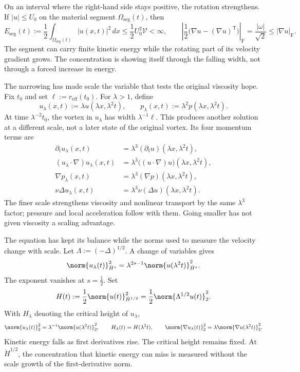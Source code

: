 On an interval where the right-hand side stays positive, the rotation strengthens.
If \(|u|\leq U_0\) on the material segment \(\Omega_{\mathrm{seg}}(t)\), then
\[
  E_{\mathrm{seg}}(t)
  :=
  \frac12\int_{\Omega_{\mathrm{seg}}(t)}|u(x,t)|^2\,dx
  \leq
  \frac12U_0^2\mathcal V
  <
  \infty,
  \qquad
  \left|\frac12\bigl(\nabla u-(\nabla u)^{\mathsf T}\bigr)\right|_{\mathrm F}
  =
  \frac{|\omega|}{\sqrt2}
  \leq
  |\nabla u|_{\mathrm F}.
\]
The segment can carry finite kinetic energy while the rotating part of its velocity gradient grows.
The concentration is showing itself through the falling width, not through a forced increase in energy.


The narrowing has made scale the variable that tests the original viscosity hope.
Fix \(t_0\) and set \(\ell:=r_{\mathrm{eff}}(t_0)\).
For \(\lambda>1\), define
\[
  u_\lambda(x,t)
  :=
  \lambda u(\lambda x,\lambda^2t),
  \qquad
  p_\lambda(x,t)
  :=
  \lambda^2p(\lambda x,\lambda^2t).
\]
At time \(\lambda^{-2}t_0\), the vortex in \(u_\lambda\) has width \(\lambda^{-1}\ell\).
This produces another solution at a different scale, not a later state of the original vortex.
Its four momentum terms are
\[
\begin{aligned}
  \partial_tu_\lambda(x,t)
  &=
  \lambda^3(\partial_tu)(\lambda x,\lambda^2t),
  \\
  (u_\lambda\cdot\nabla)u_\lambda(x,t)
  &=
  \lambda^3\bigl((u\cdot\nabla)u\bigr)(\lambda x,\lambda^2t),
  \\
  \nabla p_\lambda(x,t)
  &=
  \lambda^3(\nabla p)(\lambda x,\lambda^2t),
  \\
  \nu\Delta u_\lambda(x,t)
  &=
  \lambda^3\nu(\Delta u)(\lambda x,\lambda^2t).
\end{aligned}
\]
The finer scale strengthens viscosity and nonlinear transport by the same \(\lambda^3\) factor; pressure and local acceleration follow with them.
Going smaller has not given viscosity a scaling advantage.


The equation has kept its balance while the norms used to measure the velocity change with scale.
Let \(\Lambda:=(-\Delta)^{1/2}\).
A change of variables gives
\[
  \norm{u_\lambda(t)}_{\dot H^s}^2
  =
  \lambda^{2s-1}
  \norm{u(\lambda^2t)}_{\dot H^s}^2.
\]
The exponent vanishes at \(s=\tfrac12\).
Set
\[
  H(t)
  :=
  \frac12\norm{u(t)}_{\dot H^{1/2}}^2
  =
  \frac12\norm{\Lambda^{1/2}u(t)}_2^2.
\]
With \(H_\lambda\) denoting the critical height of \(u_\lambda\),
\[
  \norm{u_\lambda(t)}_2^2
  =
  \lambda^{-1}\norm{u(\lambda^2t)}_2^2,
  \qquad
  H_\lambda(t)=H(\lambda^2t),
  \qquad
  \norm{\nabla u_\lambda(t)}_2^2
  =
  \lambda\norm{\nabla u(\lambda^2t)}_2^2.
\]
Kinetic energy falls as first derivatives rise.
The critical height remains fixed.
At \(\dot H^{1/2}\), the concentration that kinetic energy can miss is measured without the scale growth of the first-derivative norm.

